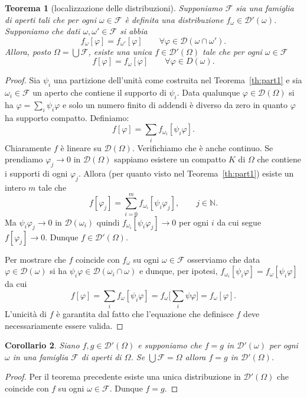 \documentclass[italian,a4paper,oneside,headinclude]{scrbook}
\renewcommand{\phi}{\varphi}
\newcommand{\D}{\mathcal D}
\newcommand{\F}{\mathcal F}
\newcommand{\NN}{\mathbb N}
\newtheorem{theorem}{Teorema}
\newtheorem{corollary}[theorem]{Corollario}
\begin{document}
\begin{theorem}[localizzazione delle distribuzioni]
  Supponiamo $\F$ sia una famiglia di aperti tali che per ogni
  $\omega\in\F$ è definita una distribuzione
  $f_\omega\in \D'(\omega)$.
  Supponiamo che dati $\omega, \omega'\in \F$ si abbia
  \[
  f_\omega[\phi] = f_{\omega'}[\phi] \qquad \forall \phi \in
  \D(\omega\cap \omega').
  \]
  Allora, posto $\Omega = \bigcup \F$, esiste una unica $f\in
  \D'(\Omega)$ tale che per ogni $\omega \in \F$
  \[
    f[\phi] = f_\omega[\phi] \qquad \forall \phi \in D(\omega).
  \]
\end{theorem}
\begin{proof}
  Sia $\psi_i$ una partizione dell'unità come costruita nel
  Teorema~\ref{th:part1} e sia $\omega_i \in \F$ un aperto che
  contiene il supporto di $\psi_i$. Data qualunque $\phi\in\D(\Omega)$
  si ha $\phi = \sum_i \psi_i \phi$ e solo un numero finito di addendi
  è diverso da zero in quanto $\phi$ ha supporto compatto.
  Definiamo:
  \[
  f[\phi] = \sum_i f_{\omega_i}[\psi_i \phi].
  \]
  Chiaramente $f$ è lineare su $\D(\Omega)$. Verifichiamo che è anche continuo.
  Se prendiamo $\phi_j\to 0$ in $\D(\Omega)$ sappiamo
  esistere un compatto $K$ di $\Omega$ che contiene i supporti di ogni
  $\phi_j$. Allora (per quanto visto nel Teorema~\ref{th:part1})
  esiste un intero $m$ tale che
  \[
  f[\phi_j] = \sum_{i=0}^m f_{\omega_i}[\psi_i\phi_j], \qquad j\in\NN.
  \]
  Ma  $\psi_i\phi_j\to 0$ in $\D(\omega_i)$ quindi
  $f_{\omega_i}[\psi_i\phi_j]\to 0$ per ogni $i$ da cui segue
  $f[\phi_j]\to 0$. Dunque $f\in \D'(\Omega)$.

  Per mostrare che $f$ coincide con $f_\omega$ su ogni $\omega\in\F$
  osserviamo che data $\phi\in \D(\omega)$ si ha
  $\psi_i\phi \in \D(\omega_i\cap \omega)$
  e dunque, per ipotesi,
  $f_{\omega_i}[\psi_i \phi] = f_\omega[\psi_i \phi]$
  da cui
  \[
  f[\phi] = \sum_i f_\omega[\psi_i \phi] = f_\omega\big[\sum_i \psi
  \phi\big] = f_\omega[\phi].
  \]
  L'unicità di $f$ è garantita dal fatto che l'equazione che definisce
  $f$ deve necessariamente essere valida.
\end{proof}

\begin{corollary}
  Siano $f,g\in \D'(\Omega)$ e supponiamo che $f=g$ in $\D'(\omega)$
  per ogni $\omega$ in una famiglia $\F$ di aperti di $\Omega$. Se
  $\bigcup \F = \Omega$ allora $f=g$ in $\D'(\Omega)$.
\end{corollary}
\begin{proof}
  Per il teorema precedente esiste una unica distribuzione in
  $\D'(\Omega)$ che coincide con $f$ su ogni $\omega\in \F$. Dunque $f=g$.
\end{proof}
\end{document}
